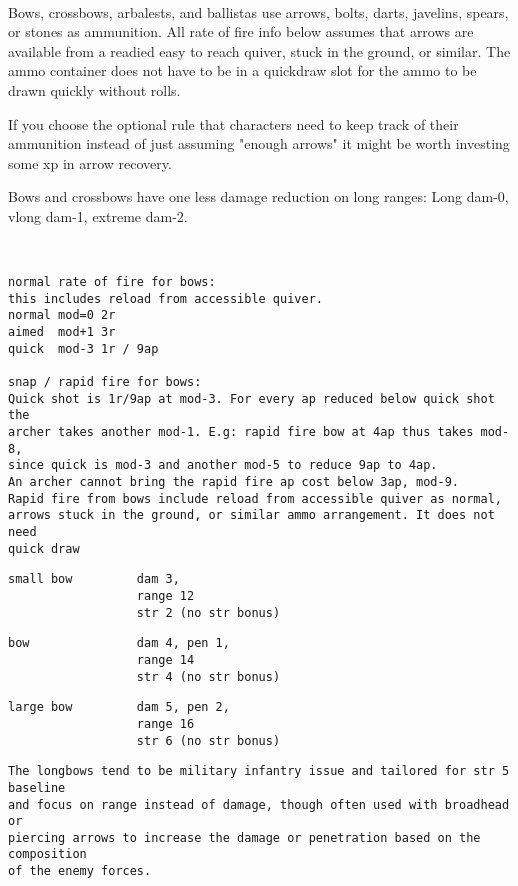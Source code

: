 \


\noindent Bows, crossbows, arbalests, and ballistas use arrows, bolts, darts, javelins, spears, or stones as ammunition. All rate of fire info below assumes that arrows are available from a readied easy to reach quiver, stuck in the ground, or similar. The ammo container does not have to be in a quickdraw slot for the ammo to be drawn quickly without rolls.

If you choose the optional rule that characters need to keep track of their ammunition instead of just assuming "enough arrows" it might be worth investing some xp in arrow recovery.

Bows and crossbows have one less damage reduction on long ranges: Long dam-0, vlong dam-1, extreme dam-2.

\

\goodbreak \small \begin{samepage} \begin{verbatim}
normal rate of fire for bows:
this includes reload from accessible quiver.
normal mod=0 2r
aimed  mod+1 3r
quick  mod-3 1r / 9ap

snap / rapid fire for bows:
Quick shot is 1r/9ap at mod-3. For every ap reduced below quick shot the
archer takes another mod-1. E.g: rapid fire bow at 4ap thus takes mod-8,
since quick is mod-3 and another mod-5 to reduce 9ap to 4ap.
An archer cannot bring the rapid fire ap cost below 3ap, mod-9.
Rapid fire from bows include reload from accessible quiver as normal,
arrows stuck in the ground, or similar ammo arrangement. It does not need
quick draw
\end{verbatim} \blocklistgap \begin{verbatim}
small bow         dam 3,
                  range 12
                  str 2 (no str bonus)
\end{verbatim} \blocklistgap \begin{verbatim}
bow               dam 4, pen 1,
                  range 14
                  str 4 (no str bonus)
\end{verbatim} \blocklistgap \begin{verbatim}
large bow         dam 5, pen 2,
                  range 16
                  str 6 (no str bonus)
\end{verbatim} \blocklistgap \begin{verbatim}
The longbows tend to be military infantry issue and tailored for str 5 baseline
and focus on range instead of damage, though often used with broadhead or
piercing arrows to increase the damage or penetration based on the composition
of the enemy forces.


\end{verbatim}
\end{samepage}

